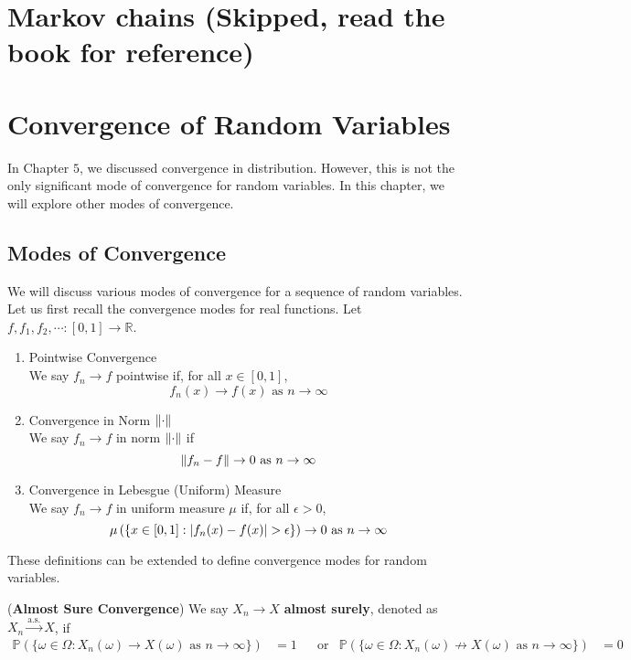 \documentclass{huhtakm-template-book}
\newcommand{\prob}{\mathbb{P}}
\begin{document}
\chapter{Markov chains (Skipped, read the book for reference)}

\chapter{Convergence of Random Variables}
    In Chapter $5$, we discussed convergence in distribution. However, this is not the only significant mode of convergence for random variables. In this chapter, we will explore other modes of convergence.
\section{Modes of Convergence}
    We will discuss various modes of convergence for a sequence of random variables.\\
    Let us first recall the convergence modes for real functions. Let $f,f_{1},f_{2},\cdots:[0,1]\to\mathbb{R}$.
    \begin{enumerate}
        \item Pointwise Convergence\\
        We say $f_{n}\to f$ pointwise if, for all $x\in[0,1]$,
        \begin{equation*}
            f_{n}(x)\to f(x)\text{ as }n\to\infty
        \end{equation*}
        \item Convergence in Norm $\lVert{\cdot}\rVert$\\
        We say $f_{n}\to f$ in norm $\lVert{\cdot}\rVert$ if
        \begin{equation*}
            \lVert{f_{n}-f}\rVert\to 0\text{ as }n\to\infty
        \end{equation*}
        \item Convergence in Lebesgue (Uniform) Measure\\
        We say $f_{n}\to f$ in uniform measure $\mu$ if, for all $\epsilon>0$,
        \begin{equation*}
            \mu\left(\{x\in[0,1]:\abs{f_{n}(x)-f(x)}>\epsilon\}\right)\to 0\text{ as }n\to\infty
        \end{equation*}
    \end{enumerate}
    These definitions can be extended to define convergence modes for random variables.
    \begin{defn}(\textbf{Almost Sure Convergence})
        We say $X_{n}\to X$ \textbf{almost surely}, denoted as $X_{n}\xrightarrow{\text{a.s.}}X$, if
        \begin{align*}
            \prob(\{\omega\in\Omega:X_{n}(\omega)\to X(\omega)\text{ as }n\to\infty\})&=1 & &\text{or} & \prob(\{\omega\in\Omega:X_{n}(\omega)\not\to X(\omega)\text{ as }n\to\infty\})&=0
        \end{align*}
    \end{defn}
\end{document}
